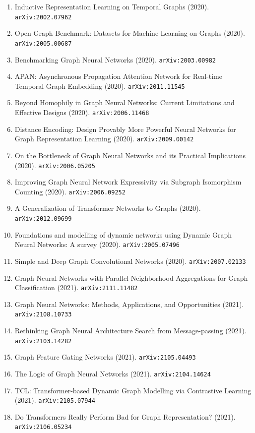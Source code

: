\documentclass[11pt]{article}
\begin{document}
\begin{enumerate}
  \item Inductive Representation Learning on Temporal Graphs (2020). \texttt{arXiv:2002.07962}
  \item Open Graph Benchmark: Datasets for Machine Learning on Graphs (2020). \texttt{arXiv:2005.00687}
  \item Benchmarking Graph Neural Networks (2020). \texttt{arXiv:2003.00982}
  \item APAN: Asynchronous Propagation Attention Network for Real-time Temporal
  Graph Embedding (2020). \texttt{arXiv:2011.11545}
  \item Beyond Homophily in Graph Neural Networks: Current Limitations and
  Effective Designs (2020). \texttt{arXiv:2006.11468}
  \item Distance Encoding: Design Provably More Powerful Neural Networks for
  Graph Representation Learning (2020). \texttt{arXiv:2009.00142}
  \item On the Bottleneck of Graph Neural Networks and its Practical
  Implications (2020). \texttt{arXiv:2006.05205}
  \item Improving Graph Neural Network Expressivity via Subgraph Isomorphism
  Counting (2020). \texttt{arXiv:2006.09252}
  \item A Generalization of Transformer Networks to Graphs (2020). \texttt{arXiv:2012.09699}
  \item Foundations and modelling of dynamic networks using Dynamic Graph Neural
  Networks: A survey (2020). \texttt{arXiv:2005.07496}
  \item Simple and Deep Graph Convolutional Networks (2020). \texttt{arXiv:2007.02133}
  \item Graph Neural Networks with Parallel Neighborhood Aggregations for Graph
  Classification (2021). \texttt{arXiv:2111.11482}
  \item Graph Neural Networks: Methods, Applications, and Opportunities (2021). \texttt{arXiv:2108.10733}
  \item Rethinking Graph Neural Architecture Search from Message-passing (2021). \texttt{arXiv:2103.14282}
  \item Graph Feature Gating Networks (2021). \texttt{arXiv:2105.04493}
  \item The Logic of Graph Neural Networks (2021). \texttt{arXiv:2104.14624}
  \item TCL: Transformer-based Dynamic Graph Modelling via Contrastive Learning (2021). \texttt{arXiv:2105.07944}
  \item Do Transformers Really Perform Bad for Graph Representation? (2021). \texttt{arXiv:2106.05234}

\end{enumerate}
\end{document}
